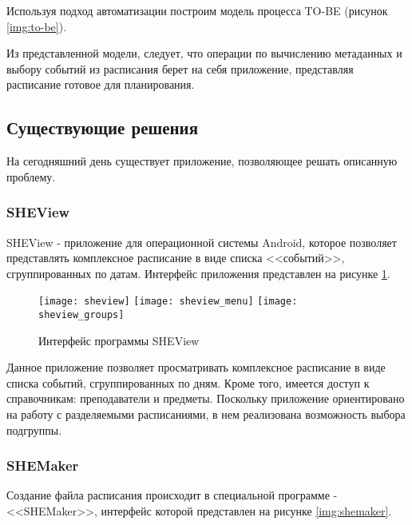 Используя подход автоматизации построим модель процесса TO-BE (рисунок \ref{img:to-be}).


Из представленной модели, следует, что операции по вычислению метаданных и выбору событий из расписания берет на себя приложение, представляя расписание готовое для планирования.

\subsection{Существующие решения}

На сегодняшний день существует приложение, позволяющее решать описанную проблему.

\subsubsection{SHEView}

SHEView - приложение для операционной системы Android, которое позволяет представлять комплексное расписание в виде списка <<событий>>, сгруппированных по датам.
Интерфейс приложения представлен на рисунке \ref{img:sheview}.

\begin{figure}[!htb]
      \texttt{[image: sheview]}
  \endminipage\hfill
      \texttt{[image: sheview\_menu]}
  \endminipage\hfill
      \texttt{[image: sheview\_groups]}
  \endminipage
  \caption{Интерфейс программы SHEView} \label{img:sheview}
\end{figure}

Данное приложение позволяет просматривать комплексное расписание в виде списка событий, сгруппированных по дням.
Кроме того, имеется доступ к справочникам: преподаватели и предметы.
Поскольку приложение ориентировано на работу с разделяемыми расписаниями, в нем реализована возможность выбора подгруппы.

\subsubsection{SHEMaker}

Создание файла расписания происходит в специальной программе - <<SHEMaker>>, интерфейс которой представлен на рисунке \ref{img:shemaker}.

